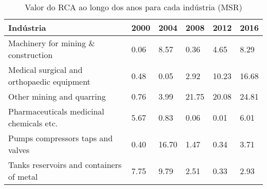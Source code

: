 \begin{table}
\centering
\caption{Valor do RCA ao longo dos anos para cada indústria (MSR)}
\begin{tabular}{p{6cm}p{1.5cm}p{1.5cm}p{1.5cm}p{1.5cm}p{1.5cm}}
\toprule
                                 Indústria & 2000 &  2004 &  2008 &  2012 &  2016 \\
\midrule
       Machinery for mining \& construction & 0.06 &  8.57 &  0.36 &  4.65 &  8.29 \\
Medical surgical and orthopaedic equipment & 0.48 &  0.05 &  2.92 & 10.23 & 16.68 \\
                 Other mining and quarring & 0.76 &  3.99 & 21.75 & 20.08 & 24.81 \\
  Pharmaceuticals medicinal chemicals etc. & 5.67 &  0.83 &  0.06 &  0.01 &  6.01 \\
         Pumps compressors taps and valves & 0.40 & 16.70 &  1.47 &  0.34 &  3.71 \\
  Tanks reservoirs and containers of metal & 7.75 &  9.79 &  2.51 &  0.33 &  2.93 \\
\bottomrule
\end{tabular}
\end{table}
